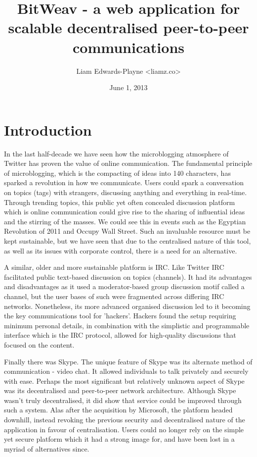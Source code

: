 \documentclass[10pt,a4paper,onecolumn]{article}
\author{Liam Edwards-Playne \textless liamz.co\textgreater}
\date{June 1, 2013}
\title{BitWeav - a web application for scalable decentralised peer-to-peer  communications}
\begin{document}
\maketitle
\begin{abstract}
\end{abstract}

\section{Introduction}
In the last half-decade we have seen how the microblogging atmosphere of Twitter has proven the value of online communication. The fundamental principle of microblogging, which is the compacting of ideas into 140 characters, has sparked a revolution in how we communicate. Users could spark a conversation on topics (tags) with strangers, discussing anything and everything in real-time. Through trending topics, this public yet often concealed discussion platform which is online communication could give rise to the sharing of influential ideas and the stirring of the masses. We could see this in events such as the Egyptian Revolution of 2011 and Occupy Wall Street. Such an invaluable resource must be kept sustainable, but we have seen that due to the centralised nature of this tool, as well as its issues with corporate control, there is a need for an alternative. 

A similar, older and more sustainable platform is IRC. Like Twitter IRC facilitated public text-based discussion on topics (channels). It had its advantages and disadvantages as it used a moderator-based group discussion motif called a channel, but the user bases of such were fragmented across differing IRC networks. Nonetheless, its more advanced organised discussion led to it becoming the key communications tool for 'hackers'. Hackers found the setup requiring minimum personal details, in combination with the simplistic and programmable interface which is the IRC protocol, allowed for high-quality discussions that focused on the content. 

Finally there was Skype. The unique feature of Skype was its alternate method of communication - video chat. It allowed individuals to talk privately and securely with ease. Perhaps the most significant but relatively unknown aspect of Skype was its decentralised and peer-to-peer network architecture. Although Skype wasn't truly decentralised, it did show that service could be improved through such a system. Alas after the acquisition by Microsoft, the platform headed downhill, instead revoking the previous security and decentralised nature of the application in favour of centralisation. Users could no longer rely on the simple yet secure platform which it had a strong image for, and have been lost in a myriad of alternatives since. 
\end{document}
